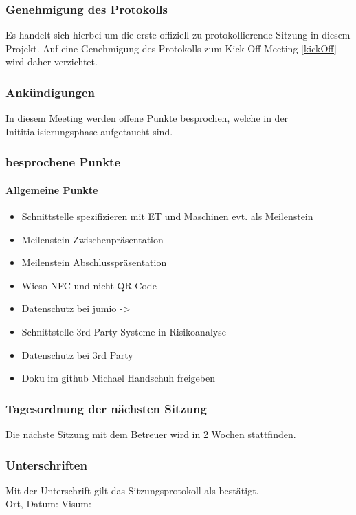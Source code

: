 \subsubsection{Genehmigung des Protokolls}
Es handelt sich hierbei um die erste offiziell zu protokollierende Sitzung in diesem Projekt. Auf eine Genehmigung des Protokolls zum Kick-Off Meeting \ref{kickOff} wird daher verzichtet. 
\subsubsection{Ankündigungen}
In diesem Meeting werden offene Punkte besprochen, welche in der Inititialisierungsphase aufgetaucht sind. 
\subsubsection{besprochene Punkte}
\paragraph{Allgemeine Punkte}
\begin{itemize}
	\item Schnittstelle spezifizieren mit ET und Maschinen evt. als Meilenstein
	\item Meilenstein Zwischenpräsentation
	\item Meilenstein Abschlusspräsentation
	\item Wieso NFC und nicht QR-Code
	\item Datenschutz bei jumio -> 
	\item Schnittstelle 3rd Party Systeme in Risikoanalyse
	\item Datenschutz bei 3rd Party
	\item Doku im github Michael Handschuh freigeben
\end{itemize}
\subsubsection{Tagesordnung der nächsten Sitzung}
Die nächste Sitzung mit dem Betreuer wird in 2 Wochen stattfinden. 
\subsubsection{Unterschriften}

Mit der Unterschrift gilt das Sitzungsprotokoll als bestätigt.\\

Ort, Datum:	\underline{\hspace*{6cm}}	\hspace*{1cm} Visum:	\underline{\hspace*{4cm}}


